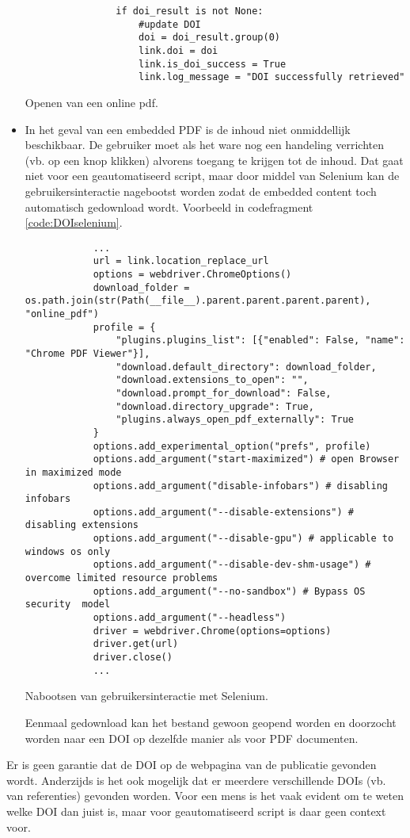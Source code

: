 \begin{itemize}
\begin{listing}
\begin{verbatim}
                if doi_result is not None:
                    #update DOI
                    doi = doi_result.group(0)
                    link.doi = doi
                    link.is_doi_success = True
                    link.log_message = "DOI successfully retrieved"
        \end{verbatim}
        \caption[Pymupdf]{Openen van een online pdf.}
        \label{code:DOIpymupdf}
    \end{listing}
    \item In het geval van een embedded PDF is de inhoud niet onmiddellijk beschikbaar. De gebruiker moet als het ware nog een handeling verrichten (vb. op een knop klikken) alvorens toegang te krijgen tot de inhoud. Dat gaat niet voor een geautomatiseerd script, maar door middel van Selenium \autocite{Selenium2025} kan de gebruikersinteractie nagebootst worden zodat de embedded content toch automatisch gedownload wordt. Voorbeeld in codefragment \ref{code:DOIselenium}.
    \begin{listing}
        \begin{verbatim}
            ...
            url = link.location_replace_url
            options = webdriver.ChromeOptions()
            download_folder = os.path.join(str(Path(__file__).parent.parent.parent.parent), "online_pdf")
            profile = {
                "plugins.plugins_list": [{"enabled": False, "name": "Chrome PDF Viewer"}],
                "download.default_directory": download_folder,
                "download.extensions_to_open": "",
                "download.prompt_for_download": False,
                "download.directory_upgrade": True,
                "plugins.always_open_pdf_externally": True
            }
            options.add_experimental_option("prefs", profile)
            options.add_argument("start-maximized") # open Browser in maximized mode
            options.add_argument("disable-infobars") # disabling infobars
            options.add_argument("--disable-extensions") # disabling extensions
            options.add_argument("--disable-gpu") # applicable to windows os only
            options.add_argument("--disable-dev-shm-usage") # overcome limited resource problems
            options.add_argument("--no-sandbox") # Bypass OS security  model
            options.add_argument("--headless")
            driver = webdriver.Chrome(options=options)
            driver.get(url)
            driver.close()
            ...
        \end{verbatim}
        \caption[Selenium]{Nabootsen van gebruikersinteractie met Selenium.}
        \label{code:DOIselenium}
    \end{listing} Eenmaal gedownload kan het bestand gewoon geopend worden en doorzocht worden naar een DOI op dezelfde manier als voor PDF documenten.
\end{itemize}
Er is geen garantie dat de DOI op de webpagina van de publicatie gevonden wordt. Anderzijds is het ook mogelijk dat er meerdere verschillende DOIs (vb. van referenties) gevonden worden. Voor een mens is het vaak evident om te weten welke DOI dan juist is, maar voor geautomatiseerd script is daar geen context voor.
